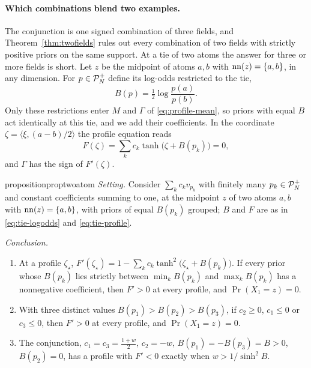 \documentclass{article} %
\theoremstyle{plain}
\theoremstyle{definition}
\theoremstyle{remark}
\begin{document}
\paragraph{Which combinations blend two examples.} The conjunction is one signed combination of
three fields, and Theorem~\ref{thm:twofields} rules out every combination of two fields with
strictly positive priors on the same support. At a tie of two atoms the answer for three or more
fields is short. Let $z$ be the midpoint of atoms $a,b$ with $\operatorname{nn}(z)=\{a,b\}$, in any dimension.
For $p\in\mathcal{P}_N^{+}$ define its log-odds restricted to the tie,
\begin{equation}
B(p)=\tfrac12\log\frac{p(a)}{p(b)} .
\label{eq:tie-logodds}
\end{equation}
Only these restrictions enter $M$ and $\Gamma$ of \eqref{eq:profile-mean}, so priors with equal
$B$ act identically at this tie, and we add their coefficients. In the coordinate
$\zeta=\langle\xi,(a-b)/2\rangle$ the profile equation reads
\begin{equation}
F(\zeta)=\sum_kc_k\tanh\bigl(\zeta+B(p_k)\bigr)=0,
\label{eq:tie-profile}
\end{equation}
and $\Gamma$ has the sign of $F'(\zeta)$.

\begin{restatable}{proposition}{proptwoatom}
\label{prop:twoatom}
\emph{Setting.} Consider $\sum_kc_kv_{p_k}$ with finitely many $p_k\in\mathcal{P}_N^{+}$ and constant coefficients summing to
one, at the midpoint $z$ of two atoms $a,b$ with $\operatorname{nn}(z)=\{a,b\}$, with priors of equal $B(p_k)$
grouped; $B$ and $F$ are as in \eqref{eq:tie-logodds} and \eqref{eq:tie-profile}.

\emph{Conclusion.}
\begin{enumerate}[label=(\alph*),leftmargin=2em]
\item At a profile $\zeta_\star$, $F'(\zeta_\star)=1-\sum_kc_k\tanh^2\bigl(\zeta_\star+B(p_k)\bigr)$.
  If every prior whose $B(p_k)$ lies strictly between $\min_kB(p_k)$ and $\max_kB(p_k)$ has a
  nonnegative coefficient, then $F'>0$ at every profile, and $\Pr(X_1=z)=0$.
\item With three distinct values $B(p_1)>B(p_2)>B(p_3)$, if $c_2\ge0$, $c_1\le0$ or $c_3\le0$,
  then $F'>0$ at every profile, and $\Pr(X_1=z)=0$.
\item The conjunction, $c_1=c_3=\tfrac{1+w}2$, $c_2=-w$, $B(p_1)=-B(p_3)=B>0$, $B(p_2)=0$, has a
  profile with $F'<0$ exactly when $w>1/\sinh^2B$.
\end{enumerate}
\end{restatable}
\end{document}
